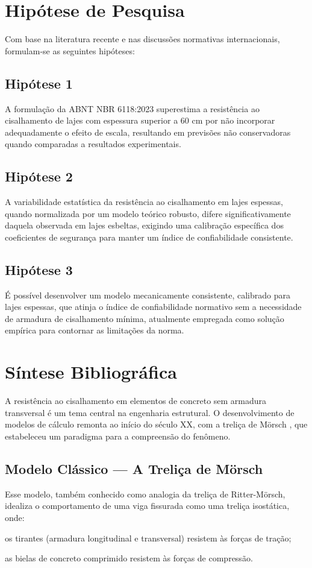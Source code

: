 \documentclass[
	12pt,				%
	openright,			%
	twoside,			%
	a4paper,			%
	chapter=TITLE,		%
	section=TITLE,		%
	subsection=TITLE,	%
	subsubsection=TITLE,%
	partnum=false,
	brazil,			%
]{abntex2}
\begin{document}
\chapter{Hipótese de Pesquisa}
Com base na literatura recente e nas discussões normativas internacionais, formulam-se as seguintes hipóteses:

\section{Hipótese 1}
A formulação da ABNT NBR 6118:2023 superestima a resistência ao cisalhamento de lajes com espessura superior a 60 cm por não incorporar adequadamente o efeito de escala, resultando em previsões não conservadoras quando comparadas a resultados experimentais.

\section{Hipótese 2}
A variabilidade estatística da resistência ao cisalhamento em lajes espessas, quando normalizada por um modelo teórico robusto, difere significativamente daquela observada em lajes esbeltas, exigindo uma calibração específica dos coeficientes de segurança para manter um índice de confiabilidade consistente.

\section{Hipótese 3}
É possível desenvolver um modelo mecanicamente consistente, calibrado para lajes espessas, que atinja o índice de confiabilidade normativo sem a necessidade de armadura de cisalhamento mínima, atualmente empregada como solução empírica para contornar as limitações da norma.

\chapter{Síntese Bibliográfica}

A resistência ao cisalhamento em elementos de concreto sem armadura transversal é um tema central na engenharia estrutural. O desenvolvimento de modelos de cálculo remonta ao início do século XX, com a treliça de Mörsch \cite{Morsch1909}, que estabeleceu um paradigma para a compreensão do fenômeno.

\section{Modelo Clássico — A Treliça de Mörsch}
Esse modelo, também conhecido como analogia da treliça de Ritter-Mörsch, idealiza o comportamento de uma viga fissurada como uma treliça isostática, onde:
\begin{alineas}
    \item os tirantes (armadura longitudinal e transversal) resistem às forças de tração;
    \item as bielas de concreto comprimido resistem às forças de compressão.
\end{alineas}
\end{document}
